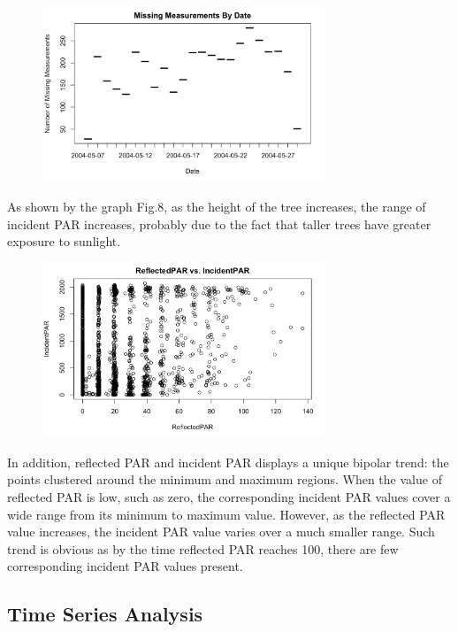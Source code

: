\documentclass[twocolumn,11pt]{asme2ej}
\begin{document}
\begin{figure}
    \centering
    \includegraphics[width=85mm]{2b.png} 
    \caption{}
    \label{fig:2b}
\end{figure}

As shown by the graph Fig.8, as the height of the tree increases, the range of incident PAR increases, probably due to the fact that taller trees have greater exposure to sunlight. 

\begin{figure}
    \centering
    \includegraphics[width=85mm]{3b2.png} 
    \caption{}
    \label{fig:3b2}
\end{figure}

In addition, reflected PAR and incident PAR displays a unique bipolar trend: the points clustered around the minimum and maximum regions. When the value of reflected PAR is low, such as zero, the corresponding incident PAR values cover a wide range from its minimum to maximum value. However, as the reflected PAR value increases, the incident PAR value varies over a much smaller range. Such trend is obvious as by the time reflected PAR reaches 100, there are few corresponding incident PAR values present. 

\subsection{Time Series Analysis}
\end{document}
